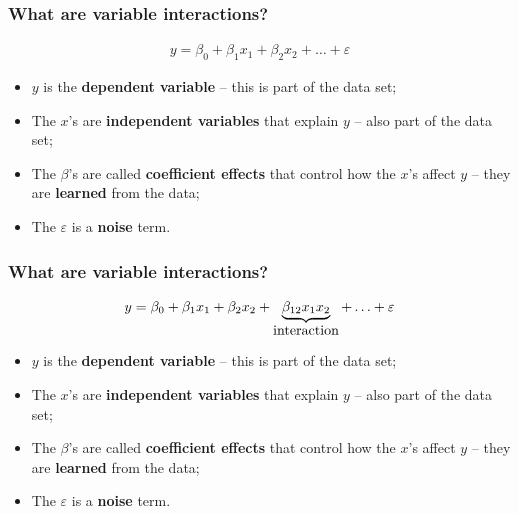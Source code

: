 \documentclass[aspectratio=169]{beamer}
\theoremstyle{principle}
\begin{document}
\begin{frame}
\frametitle{What are \textbf{variable interactions}?}


\huge
\begin{align*}
y = \beta_0 + \beta_1x_1 + \beta_2x_2 + \hdots + \varepsilon
\end{align*}
\bigskip
\normalsize
\begin{itemize}
\item $y$ is the \textbf{dependent variable} -- this is part of the data set;
\item The $x$'s are \textbf{independent variables} that explain $y$ -- also part of the data set;
\item The $\beta$'s are called \textbf{coefficient effects} that control how the $x$'s affect $y$ -- they are \textbf{learned} from the data;
\item The $\varepsilon$ is a \textbf{noise} term.

\end{itemize}
\bigskip
\bigskip


\end{frame}

\begin{frame}
\frametitle{What are \textbf{variable interactions}?}


\huge
\begin{align*}
y = \beta_0 + \beta_1x_1 + \beta_2x_2 + \underbrace{\beta_{12}x_1x_2}_{\mbox{\normalsize interaction}} + \hdots + \varepsilon
\end{align*}
\bigskip
\normalsize
\begin{itemize}
\item $y$ is the \textbf{dependent variable} -- this is part of the data set;
\item The $x$'s are \textbf{independent variables} that explain $y$ -- also part of the data set;
\item The $\beta$'s are called \textbf{coefficient effects} that control how the $x$'s affect $y$ -- they are \textbf{learned} from the data;
\item The $\varepsilon$ is a \textbf{noise} term.

\end{itemize}
\bigskip
\bigskip


\end{frame}
\end{document}
